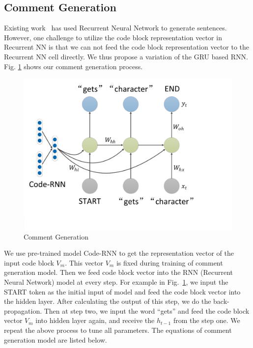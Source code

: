 \subsection{Comment Generation}
Existing work~\cite{elman1990finding,sutskever2011generating,mikolov2010recurrent} has used Recurrent Neural Network to generate sentences.
However, one challenge to utilize the code block representation vector
in Recurrent NN is that we can not feed the code block representation vector to
the Recurrent NN cell directly.
We thus propose a variation of the GRU based RNN.
Fig. \ref{fig:comment_generate} shows our comment generation process.

\begin{figure}[th]
\centering
	\includegraphics[width=0.8\linewidth]{img/comment_generation.pdf}
\caption{Comment Generation}\label{fig:comment_generate}
\end{figure}


We use pre-trained model Code-RNN to get the representation vector of
the input code block $V_{m}$. This vector $V_{m}$ is fixed during training of
comment generation model. Then we feed code block vector into the
RNN (Recurrent Neural Network) model at every step.
For example in Fig.~\ref{fig:comment_generate}, we input the START token
as the initial input of model and feed the code block vector into the hidden
layer. After calculating the output of this step, we do the
back-propagation. Then at step two, we input the word ``gets'' and
feed the code block vector $V_{m}$ into hidden layer again,
and receive the $h_{t-1}$ from the step one. We repeat the above
process to tune all parameters. The equations of comment generation model
are listed below.

